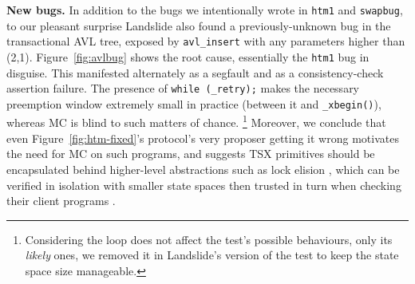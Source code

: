 \documentclass[10pt]{sigplanconf}
\begin{document}
		{\bf New bugs.}
		In addition to the bugs we intentionally wrote in {\tt htm1} and {\tt swapbug},
		to our pleasant surprise
		Landslide also found a previously-unknown bug in the transactional AVL tree,
		exposed by {\tt avl\_insert} with any parameters higher than (2,1).
		Figure~\ref{fig:avlbug} shows the root cause, essentially the {\tt htm1} bug in disguise.
		This manifested
		alternately
		as a segfault
		and
		as a consistency-check assertion failure.
		The presence of {\tt while (\_retry);} makes the necessary preemption window extremely small
		in practice (between it and {\tt \_xbegin()}),
		whereas MC is blind to such matters of chance.%
		\footnote{Considering the loop does not affect the test's possible behaviours,
		only its {\em likely} ones,
		we removed it in Landslide's version of the test to keep the state space size manageable.}
		Moreover, we conclude that even Figure~\ref{fig:htm-fixed}'s protocol's very proposer %
		getting it wrong motivates the need for MC on such programs,
		and suggests TSX primitives should be encapsulated behind higher-level abstractions
		such as lock elision \cite{lock-elision},
		which can be verified in isolation with smaller state spaces
		then trusted in turn when checking their client programs \cite{dbug-phdthesis}.
\end{document}
